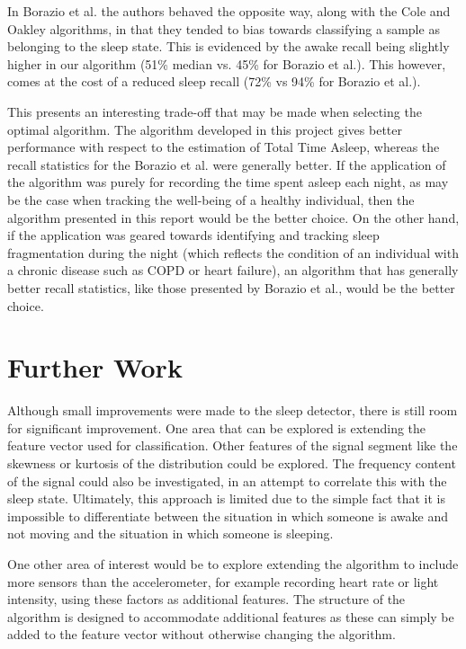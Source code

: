             In Borazio et al. the authors behaved the opposite way, along with the Cole \cite{cole} and Oakley \cite{oakley} algorithms, in that they tended to bias towards classifying a sample as belonging to the sleep state. This is evidenced by the awake recall being slightly higher in our algorithm (51\% median vs. 45\% for Borazio et al.). This however, comes at the cost of a reduced sleep recall (72\% vs 94\% for Borazio et al.).

            This presents an interesting trade-off that may be made when selecting the optimal algorithm. The algorithm developed in this project gives better performance with respect to the estimation of Total Time Asleep, whereas the recall statistics for the Borazio et al. were generally better. If the application of the algorithm was purely for recording the time spent asleep each night, as may be the case when tracking the well-being of a healthy individual, then the algorithm presented in this report would be the better choice. On the other hand, if the application was geared towards identifying and tracking sleep fragmentation during the night (which reflects the condition of an individual with a chronic disease such as COPD or heart failure), an algorithm that has generally better recall statistics, like those presented by Borazio et al., would be the better choice. 


    \chapter{Further Work}

        Although small improvements were made to the sleep detector, there is still room for significant improvement. One area that can be explored is extending the feature vector used for classification. Other features of the signal segment like the skewness or kurtosis of the distribution could be explored. The frequency content of the signal could also be investigated, in an attempt to correlate this with the sleep state. Ultimately, this approach is limited due to the simple fact that it is impossible to differentiate between the situation in which someone is awake and not moving and the situation in which someone is sleeping. 

        One other area of interest would be to explore extending the algorithm to include more sensors than the accelerometer, for example recording heart rate or light intensity, using these factors as additional features. The structure of the algorithm is designed to accommodate additional features as these can simply be added to the feature vector without otherwise changing the algorithm.